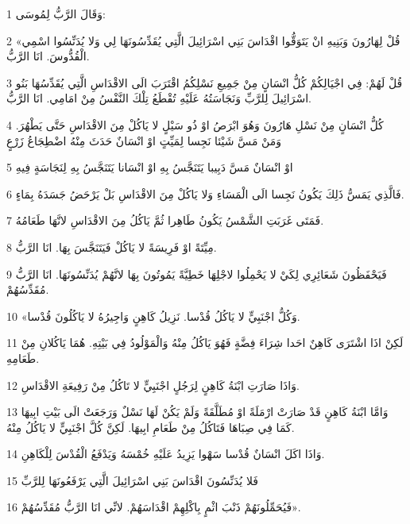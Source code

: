 \par 1 وَقَالَ الرَّبُّ لِمُوسَى:
\par 2 «قُلْ لِهَارُونَ وَبَنِيهِ انْ يَتَوَقُّوا اقْدَاسَ بَنِي اسْرَائِيلَ الَّتِي يُقَدِّسُونَهَا لِي وَلا يُدَنِّسُوا اسْمِي الْقُدُّوسَ. انَا الرَّبُّ.
\par 3 قُلْ لَهُمْ: فِي اجْيَالِكُمْ كُلُّ انْسَانٍ مِنْ جَمِيعِ نَسْلِكُمُ اقْتَرَبَ الَى الاقْدَاسِ الَّتِي يُقَدِّسُهَا بَنُو اسْرَائِيلَ لِلرَّبِّ وَنَجَاسَتُهُ عَلَيْهِ تُقْطَعُ تِلْكَ النَّفْسُ مِنْ امَامِي. انَا الرَّبُّ.
\par 4 كُلُّ انْسَانٍ مِنْ نَسْلِ هَارُونَ وَهُوَ ابْرَصُ اوْ ذُو سَيْلٍ لا يَاكُلْ مِنَ الاقْدَاسِ حَتَّى يَطْهُرَ. وَمَنْ مَسَّ شَيْئا نَجِسا لِمَيِّتٍ اوْ انْسَانٌ حَدَثَ مِنْهُ اضْطِجَاعُ زَرْعٍ
\par 5 اوْ انْسَانٌ مَسَّ دَبِيبا يَتَنَجَّسُ بِهِ اوْ انْسَانا يَتَنَجَّسُ بِهِ لِنَجَاسَةٍ فِيهِ
\par 6 فَالَّذِي يَمَسُّ ذَلِكَ يَكُونُ نَجِسا الَى الْمَسَاءِ وَلا يَاكُلْ مِنَ الاقْدَاسِ بَلْ يَرْحَضُ جَسَدَهُ بِمَاءٍ.
\par 7 فَمَتَى غَرَبَتِ الشَّمْسُ يَكُونُ طَاهِرا ثُمَّ يَاكُلُ مِنَ الاقْدَاسِ لانَّهَا طَعَامُهُ.
\par 8 مِيِّتَةً اوْ فَرِيسَةً لا يَاكُلْ فَيَتَنَجَّسَ بِهَا. انَا الرَّبُّ.
\par 9 فَيَحْفَظُونَ شَعَائِرِي لِكَيْ لا يَحْمِلُوا لاجْلِهَا خَطِيَّةً يَمُوتُونَ بِهَا لانَّهُمْ يُدَنِّسُونَهَا. انَا الرَّبُّ مُقَدِّسُهُمْ.
\par 10 «وَكُلُّ اجْنَبِيٍّ لا يَاكُلُ قُدْسا. نَزِيلُ كَاهِنٍ وَاجِيرُهُ لا يَاكُلُونَ قُدْسا.
\par 11 لَكِنْ اذَا اشْتَرَى كَاهِنٌ احَدا شِرَاءَ فِضَّةٍ فَهُوَ يَاكُلُ مِنْهُ وَالْمَوْلُودُ فِي بَيْتِهِ. هُمَا يَاكُلانِ مِنْ طَعَامِهِ.
\par 12 وَاذَا صَارَتِ ابْنَةُ كَاهِنٍ لِرَجُلٍ اجْنَبِيٍّ لا تَاكُلُ مِنْ رَفِيعَةِ الاقْدَاسِ.
\par 13 وَامَّا ابْنَةُ كَاهِنٍ قَدْ صَارَتْ ارْمَلَةً اوْ مُطَلَّقَةً وَلَمْ يَكُنْ لَهَا نَسْلٌ وَرَجَعَتْ الَى بَيْتِ ابِيهَا كَمَا فِي صِبَاهَا فَتَاكُلُ مِنْ طَعَامِ ابِيهَا. لَكِنَّ كُلَّ اجْنَبِيٍّ لا يَاكُلُ مِنْهُ.
\par 14 وَاذَا اكَلَ انْسَانٌ قُدْسا سَهْوا يَزِيدُ عَلَيْهِ خُمْسَهُ وَيَدْفَعُ الْقُدْسَ لِلْكَاهِنِ.
\par 15 فَلا يُدَنِّسُونَ اقْدَاسَ بَنِي اسْرَائِيلَ الَّتِي يَرْفَعُونَهَا لِلرَّبِّ
\par 16 فَيُحَمِّلُونَهُمْ ذَنْبَ اثْمٍ بِاكْلِهِمْ اقْدَاسَهُمْ. لانِّي انَا الرَّبُّ مُقَدِّسُهُمْ».
